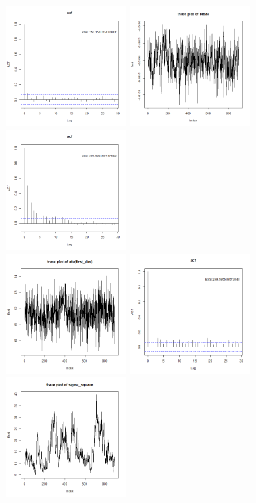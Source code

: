 \documentclass{article}
\begin{document}
\begin{figure}[!h]
    \includegraphics[width=4cm]{prob2_beta2_acf.png}
    \includegraphics[width=4cm]{prob2_beta3_traceplot.png}
    \includegraphics[width=4cm]{prob2_beta3_acf.png}\\
    \includegraphics[width=4cm]{prob2_eta(first_dim)_traceplot.png}
    \includegraphics[width=4cm]{prob2_eta(first_dim)_acf.png}
    \includegraphics[width=4cm]{prob2_sigma_square_traceplot.png}

\end{figure}
\end{document}
